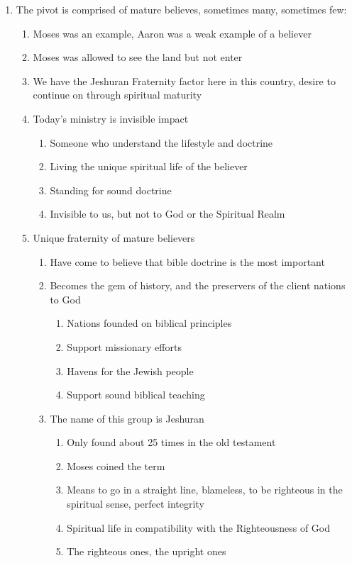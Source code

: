 \documentclass[11pt]{article}
\begin{document}
\begin{enumerate}
	\item The pivot is comprised of mature believes, sometimes many, sometimes few:
	\begin{enumerate}
		\item Moses was an example, Aaron was a weak example of a believer
		\item Moses was allowed to see the land but not enter
		\item We have the Jeshuran Fraternity factor here in this country, desire to continue on through spiritual maturity
		\item Today's ministry is invisible impact
		\begin{enumerate}
			\item Someone who understand the lifestyle and doctrine
			\item Living the unique spiritual life of the believer
			\item Standing for sound doctrine
			\item Invisible to us, but not to God or the Spiritual Realm
		\end{enumerate}
		\item Unique fraternity of mature believers
		\begin{enumerate}
			\item Have come to believe that bible doctrine is the most important
			\item Becomes the gem of history, and the preservers of the client nations to God
			\begin{enumerate}
				\item Nations founded on biblical principles
				\item Support missionary efforts
				\item Havens for the Jewish people
				\item Support sound biblical teaching
			\end{enumerate}
			\item The name of this group is Jeshuran
			\begin{enumerate}
				\item Only found about 25 times in the old testament
				\item Moses coined the term
				\item Means to go in a straight line, blameless, to be righteous in the spiritual sense, perfect integrity
				\item Spiritual life in compatibility with the Righteousness of God
				\item The righteous ones, the upright ones
			\end{enumerate}
		\end{enumerate}
	

\end{enumerate}
\end{enumerate}
\end{document}
